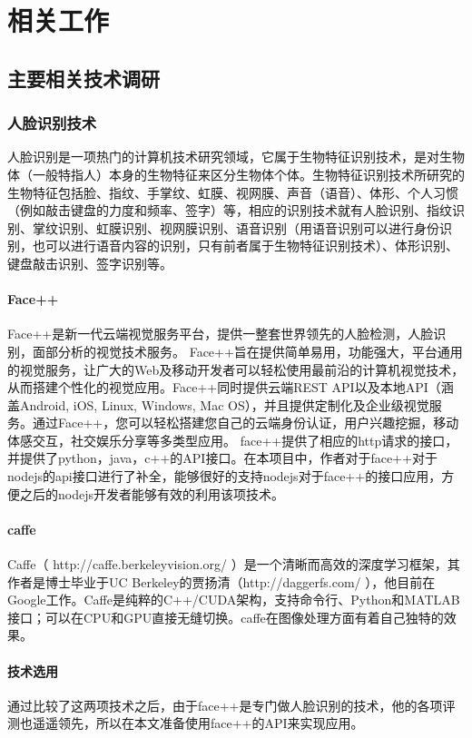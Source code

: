
\chapter{相关工作}

\section{主要相关技术调研}
\subsection{人脸识别技术}
人脸识别是一项热门的计算机技术研究领域，它属于生物特征识别技术，是对生物体（一般特指人）本身的生物特征来区分生物体个体。生物特征识别技术所研究的生物特征包括脸、指纹、手掌纹、虹膜、视网膜、声音（语音）、体形、个人习惯（例如敲击键盘的力度和频率、签字）等，相应的识别技术就有人脸识别、指纹识别、掌纹识别、虹膜识别、视网膜识别、语音识别（用语音识别可以进行身份识别，也可以进行语音内容的识别，只有前者属于生物特征识别技术）、体形识别、键盘敲击识别、签字识别等。
\subsubsection*{Face++}
Face++是新一代云端视觉服务平台，提供一整套世界领先的人脸检测，人脸识别，面部分析的视觉技术服务。
Face++旨在提供简单易用，功能强大，平台通用的视觉服务，让广大的Web及移动开发者可以轻松使用最前沿的计算机视觉技术，从而搭建个性化的视觉应用。Face++同时提供云端REST API以及本地API（涵盖Android, iOS, Linux, Windows, Mac OS），并且提供定制化及企业级视觉服务。通过Face++，您可以轻松搭建您自己的云端身份认证，用户兴趣挖掘，移动体感交互，社交娱乐分享等多类型应用。
face++提供了相应的http请求的接口，并提供了python，java，c++的API接口。在本项目中，作者对于face++对于nodejs的api接口进行了补全，能够很好的支持nodejs对于face++的接口应用，方便之后的nodejs开发者能够有效的利用该项技术。

\subsubsection*{caffe}
Caffe（ http://caffe.berkeleyvision.org/ ）是一个清晰而高效的深度学习框架，其作者是博士毕业于UC Berkeley的贾扬清（http://daggerfs.com/ ），他目前在Google工作。Caffe是纯粹的C++/CUDA架构，支持命令行、Python和MATLAB接口；可以在CPU和GPU直接无缝切换。caffe在图像处理方面有着自己独特的效果。

\subsubsection{技术选用}
通过比较了这两项技术之后，由于face++是专门做人脸识别的技术，他的各项评测也遥遥领先，所以在本文准备使用face++的API来实现应用。


